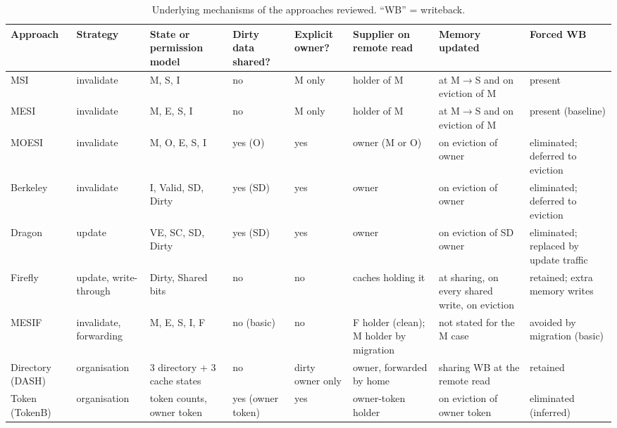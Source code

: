 \begin{table}[htbp]
\centering
\caption{Underlying mechanisms of the approaches reviewed. ``WB'' = writeback.}
\label{tab:mechanisms}
\scriptsize
\begin{tabular}{@{}L{1.25cm} L{1.35cm} L{1.75cm} L{1.05cm} L{1.05cm} L{1.75cm} L{1.85cm} L{1.75cm}@{}}
\toprule
Approach & Strategy & State or permission model & Dirty data shared? &
  Explicit owner? & Supplier on remote read & Memory updated & Forced WB \\
\midrule
MSI & invalidate & M, S, I~\cite{sarangi2025basic} & no & M only & holder of M &
  at M$\to$S and on eviction of M & present \\
MESI & invalidate & M, E, S, I~\cite{papamarcos1984illinois} & no & M only & holder of M &
  at M$\to$S and on eviction of M & present (baseline) \\
MOESI & invalidate & M, O, E, S, I~\cite{sweazey1986moesi} & yes (O) & yes &
  owner (M or O) & on eviction of owner & eliminated; deferred to eviction \\
Berkeley & invalidate & I, Valid, SD, Dirty~\cite{archibald1986evaluation} & yes (SD)
  & yes & owner & on eviction of owner & eliminated; deferred to eviction \\
Dragon & update & VE, SC, SD, Dirty~\cite{archibald1986evaluation} & yes (SD)
  & yes & owner & on eviction of SD owner & eliminated; replaced by update traffic \\
Firefly & update, write-through & Dirty, Shared bits~\cite{thacker1987firefly} &
  no & no & caches holding it & at sharing, on every shared write, on eviction & retained; extra memory writes \\
MESIF & invalidate, forwarding & M, E, S, I, F~\cite{goodman2009mesif} & no (basic)
  & no & F holder (clean); M holder by migration & not stated for the M case &
  avoided by migration (basic) \\
Directory (DASH) & organisation & 3 directory + 3 cache states~\cite{lenoski1990dash}
  & no & dirty owner only & owner, forwarded by home & sharing WB at the remote read &
  retained \\
Token (TokenB) & organisation & token counts, owner token~\cite{martin2003token}
  & yes (owner token) & yes & owner-token holder & on eviction of owner token &
  eliminated (inferred) \\
\bottomrule
\end{tabular}
\end{table}

